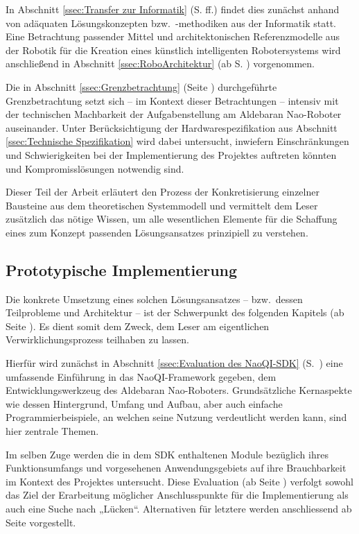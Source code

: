 \documentclass[fontsize=11pt,paper=a4,twoside,openright]{scrreprt}
\begin{document}
In Abschnitt \ref{ssec:Transfer zur Informatik} (S. \pageref{ssec:Transfer zur Informatik} ff.) findet dies zunächst anhand von adäquaten Lösungskonzepten bzw.\ -methodiken aus der Informatik statt.
Eine Betrachtung passender Mittel und architektonischen Referenzmodelle aus der Robotik für die Kreation eines künstlich intelligenten Robotersystems wird anschließend in Abschnitt \ref{ssec:RoboArchitektur} (ab S. \pageref{ssec:RoboArchitektur}) vorgenommen.

Die in Abschnitt \ref{ssec:Grenzbetrachtung} (Seite \pageref{ssec:Grenzbetrachtung}) durchgeführte Grenzbetrachtung setzt sich -- im Kontext dieser Betrachtungen -- intensiv mit der technischen Machbarkeit der Aufgabenstellung am Aldebaran Nao-Roboter auseinander.
Unter Berücksichtigung der Hardwarespezifikation aus Abschnitt \ref{ssec:Technische Spezifikation} wird dabei untersucht, inwiefern Einschränkungen und Schwierigkeiten bei der Implementierung des Projektes auftreten könnten und Kompromisslösungen notwendig sind.

Dieser Teil der Arbeit erläutert den Prozess der Konkretisierung einzelner Bausteine aus dem theoretischen Systemmodell und vermittelt dem Leser zusätzlich das nötige Wissen, um alle wesentlichen Elemente für die Schaffung eines zum Konzept passenden Lösungsansatzes prinzipiell zu verstehen.

\subsection{Prototypische Implementierung}
\label{sssec:Prototypische Implementierung}

Die konkrete Umsetzung eines solchen Lösungsansatzes -- bzw.\ dessen Teilprobleme und Architektur -- ist der Schwerpunkt des folgenden Kapitels (ab Seite \pageref{sec:Prototypische Implementierung}).
Es dient somit dem Zweck, dem Leser am eigentlichen Verwirklichungsprozess teilhaben zu lassen.

Hierfür wird zunächst in Abschnitt \ref{ssec:Evaluation des NaoQI-SDK} (S.\ \pageref{ssec:Evaluation des NaoQI-SDK}) eine umfassende Einführung in das NaoQI-Framework gegeben, dem Entwicklungswerkzeug des Aldebaran Nao-Roboters.
Grundsätzliche Kernaspekte wie dessen Hintergrund, Umfang und Aufbau, aber auch einfache Programmierbeispiele, an welchen seine Nutzung verdeutlicht werden kann, sind hier zentrale Themen.

Im selben Zuge werden die in dem SDK enthaltenen Module bezüglich ihres Funktionsumfangs und vorgesehenen Anwendungsgebiets auf ihre Brauchbarkeit im Kontext des Projektes untersucht.
Diese Evaluation (ab Seite \pageref{sssec:Kandidaten SDK}) verfolgt sowohl das Ziel der Erarbeitung möglicher Anschlusspunkte für die Implementierung als auch eine Suche nach „Lücken“.
Alternativen für letztere werden anschliessend ab Seite \pageref{sssec:Zusatzsoftware SDK} vorgestellt.
\end{document}
